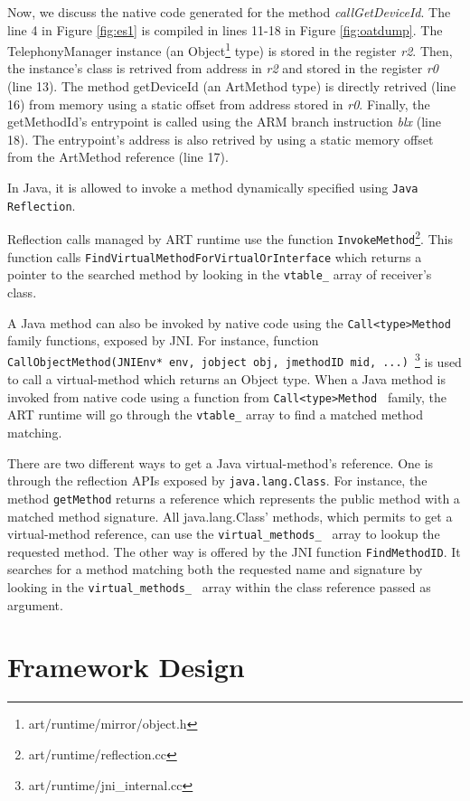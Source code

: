 Now, we discuss the native code generated for the method \textit{callGetDeviceId}. The line 4 in Figure \ref{fig:es1} is compiled in lines 11-18 in Figure \ref{fig:oatdump}. The TelephonyManager instance (an Object\footnote{art/runtime/mirror/object.h} type) is stored in the register \textit{r2}. Then, the instance's class is retrived from address in \textit{r2} and stored in the register \textit{r0} (line 13). The method getDeviceId (an ArtMethod type) is directly retrived (line 16) from memory using a static offset from address stored in \textit{r0}. Finally, the getMethodId's entrypoint is called using the ARM branch instruction \textit{blx} (line 18). The entrypoint's address is also retrived by using a static memory offset from the ArtMethod reference (line 17). 


In Java, it is allowed to invoke a method dynamically specified using {\tt Java Reflection}. 

Reflection calls managed by ART runtime use the function {\tt InvokeMethod}\footnote{art/runtime/reflection.cc}. This function calls {\tt FindVirtualMethodForVirtualOrInterface} which returns a pointer to the searched method by looking in the {\tt vtable\_} array of receiver's class.


A Java method can also be invoked by native code using the {\tt Call<type>Method } family functions, exposed by JNI. 
For instance, function {\tt CallObjectMethod(JNIEnv* env, jobject obj, jmethodID mid, ...) }\footnote{art/runtime/jni\_internal.cc} is used to call a virtual-method which returns an Object type. When a Java method is invoked from native code using a function from {\tt Call<type>Method } family, the ART runtime will go through the {\tt vtable\_} array to find a matched method matching.


There are two different ways to get a Java virtual-method's reference. One is through the reflection APIs exposed by {\tt java.lang.Class}. For instance, the method {\tt getMethod} returns a reference which represents the public method with a matched method signature. All java.lang.Class' methods, which permits to get a virtual-method reference, can use the {\tt virtual\_methods\_ } array to lookup the requested method. The other way is offered by the JNI function {\tt FindMethodID}. It searches for a method matching both the requested name and signature by looking in the {\tt virtual\_methods\_ } array within the class reference passed as argument.


\section{Framework Design}
\label{sec:artdroid}

